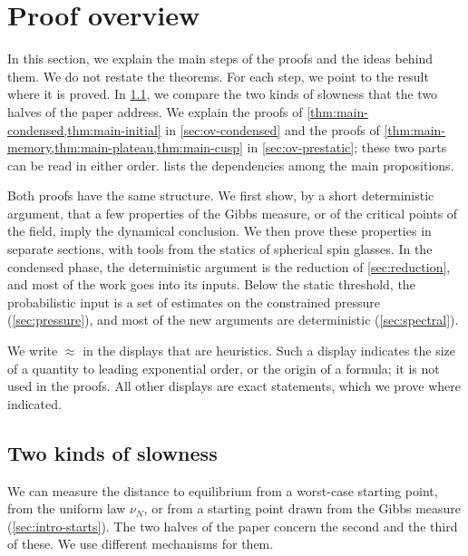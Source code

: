 \chapter{Proof overview}\label{sec:overview}

In this section, we explain the main steps of the proofs and the ideas behind them. We do not restate the theorems. For each step, we point to the result where it is proved. In \cref{sec:ov-slowness}, we compare the two kinds of slowness that the two halves of the paper address. We explain the proofs of \cref{thm:main-condensed,thm:main-initial} in \cref{sec:ov-condensed} and the proofs of \cref{thm:main-memory,thm:main-plateau,thm:main-cusp} in \cref{sec:ov-prestatic}; these two parts can be read in either order.  lists the dependencies among the main propositions.

Both proofs have the same structure. We first show, by a short deterministic argument, that a few properties of the Gibbs measure, or of the critical points of the field, imply the dynamical conclusion. We then prove these properties in separate sections, with tools from the statics of spherical spin glasses. In the condensed phase, the deterministic argument is the reduction of \cref{sec:reduction}, and most of the work goes into its inputs. Below the static threshold, the probabilistic input is a set of estimates on the constrained pressure (\cref{sec:pressure}), and most of the new arguments are deterministic (\cref{sec:spectral}).

We write $\approx$ in the displays that are heuristics. Such a display indicates the size of a quantity to leading exponential order, or the origin of a formula; it is not used in the proofs. All other displays are exact statements, which we prove where indicated.

\section{Two kinds of slowness}\label{sec:ov-slowness}

We can measure the distance to equilibrium from a worst-case starting point, from the uniform law $\nu_N$, or from a starting point drawn from the Gibbs measure (\cref{sec:intro-starts}). The two halves of the paper concern the second and the third of these. We use different mechanisms for them.

